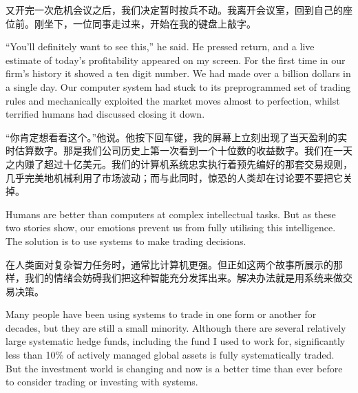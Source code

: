\begin{chineseblock}又开完一次危机会议之后，我们决定暂时按兵不动。我离开会议室，回到自己的座位前。刚坐下，一位同事走过来，开始在我的键盘上敲字。\end{chineseblock}

\bipairgap

\begin{englishblock} ``You'll definitely want to see this,'' he said. He pressed return, and a live estimate of today's profitability appeared on my screen. For the first time in our firm's history it showed a ten digit number. We had made over a billion dollars in a single day. Our computer system had stuck to its preprogrammed set of trading rules and mechanically exploited the market moves almost to perfection, whilst terrified humans had discussed closing it down. \end{englishblock}

\begin{chineseblock}“你肯定想看看这个。”他说。他按下回车键，我的屏幕上立刻出现了当天盈利的实时估算数字。那是我们公司历史上第一次看到一个十位数的收益数字。我们在一天之内赚了超过十亿美元。我们的计算机系统忠实执行着预先编好的那套交易规则，几乎完美地机械利用了市场波动；而与此同时，惊恐的人类却在讨论要不要把它关掉。\end{chineseblock}

\bipairgap

\begin{englishblock} Humans are better than computers at complex intellectual tasks. But as these two stories show, our emotions prevent us from fully utilising this intelligence. The solution is to use systems to make trading decisions. \end{englishblock}

\begin{chineseblock}在人类面对复杂智力任务时，通常比计算机更强。但正如这两个故事所展示的那样，我们的情绪会妨碍我们把这种智能充分发挥出来。解决办法就是用系统来做交易决策。\end{chineseblock}


\begin{englishblock} Many people have been using systems to trade in one form or another for decades, but they are still a small minority. Although there are several relatively large systematic hedge funds, including the fund I used to work for, significantly less than 10\% of actively managed global assets is fully systematically traded. But the investment world is changing and now is a better time than ever before to consider trading or investing with systems. \end{englishblock}

